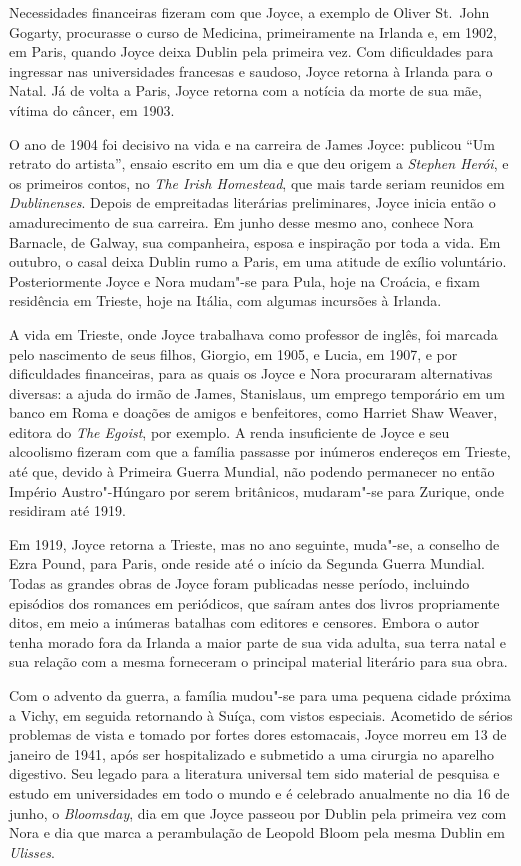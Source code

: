 Necessidades financeiras fizeram com que Joyce, a exemplo de Oliver 
St.~John Gogarty, procurasse o curso de Medicina, primeiramente na Irlanda
e, em 1902, em Paris, quando Joyce deixa Dublin pela primeira vez. Com
dificuldades para ingressar nas universidades francesas e saudoso,
Joyce retorna à Irlanda para o Natal. Já de volta a Paris, Joyce
retorna com a notícia da morte de sua mãe, vítima do câncer, em 1903. 

O ano de 1904 foi decisivo na vida e na carreira de James Joyce: 
publicou “Um retrato do artista”, ensaio escrito em um
dia e que deu origem a \textit{Stephen Herói}, e os primeiros
contos, no \textit{The Irish Homestead}, que mais tarde seriam reunidos em \textit{Dublinenses}.
Depois de empreitadas literárias preliminares, Joyce inicia então o
amadurecimento de sua carreira. Em junho desse mesmo ano, conhece Nora
Barnacle, de Galway, sua companheira, esposa e inspiração por toda a
vida. Em outubro, o casal deixa Dublin rumo a Paris, em uma atitude de
exílio voluntário. Posteriormente Joyce e Nora mudam"-se para Pula, hoje
na Croácia, e fixam residência em Trieste, hoje na Itália, com algumas
incursões à Irlanda.  

A vida em Trieste, onde Joyce trabalhava como professor de inglês, foi
marcada pelo nascimento de seus filhos, Giorgio, em 1905, e Lucia, em
1907, e por dificuldades financeiras, para as quais os Joyce e Nora
procuraram alternativas diversas: a ajuda do irmão de James,
Stanislaus, um emprego temporário em um banco em Roma e doações de
amigos e benfeitores, como Harriet Shaw Weaver, editora do \textit{The
Egoist}, por exemplo. A renda insuficiente de Joyce e seu alcoolismo
fizeram com que a família passasse por inúmeros endereços em Trieste,
até que, devido à Primeira Guerra Mundial, não podendo permanecer no
então Império Austro"-Húngaro por serem britânicos, mudaram"-se para
Zurique, onde residiram até 1919. 

Em 1919, Joyce retorna a Trieste, mas no ano seguinte, muda"-se, a
conselho de Ezra Pound, para Paris, onde reside até o início da Segunda
Guerra Mundial. Todas as grandes obras de Joyce foram publicadas nesse
período, incluindo episódios dos romances em periódicos, que saíram
antes dos livros propriamente ditos, em meio a inúmeras batalhas com
editores e censores. Embora o autor tenha morado fora da Irlanda a
maior parte de sua vida adulta, sua terra natal e sua relação com a
mesma forneceram o principal material literário para sua obra. 

Com o advento da guerra, a família mudou"-se para uma pequena cidade
próxima a Vichy, em seguida retornando à Suíça, com vistos especiais.
Acometido de sérios problemas de vista e tomado por fortes dores
estomacais, Joyce morreu em 13 de janeiro de 1941, após ser
hospitalizado e submetido a uma cirurgia no aparelho digestivo. Seu
legado para a literatura universal tem sido material de pesquisa e
estudo em universidades em todo o mundo e é celebrado anualmente no dia
16 de junho, o \textit{Bloomsday}, dia em que Joyce passeou por Dublin
pela primeira vez com Nora e dia que marca a perambulação de Leopold
Bloom pela mesma Dublin em \textit{Ulisses}.


